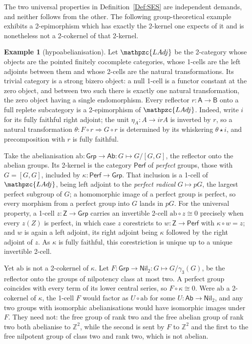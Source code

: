 \documentclass[reqno,a4paper]{amsart}
\numberwithin{equation}{section}
\theoremstyle{plain}
\theoremstyle{definition}
\newtheorem{example}[subsection]{Example}
\def\nameit#1{\textrm{#1}~}
\def\defx{\nameit{Definition}}
\def\dfn#1{{\itshape #1}}
\newcommand{\comp}{\circ}
\newcommand{\iso}{\cong}
\newcommand{\catfont}[1]{\ensuremath{\mathpzc{#1}}\xspace}
\newcommand{\onecat}[1]{\ensuremath{\mathsf{#1}}\xspace}
\newcommand{\LAdj}{\catfont{LAdj}}
\renewcommand{\1}{\onecat{1}}
\newcommand{\Grp}{\onecat{Grp}}
\newcommand{\Ab}{\onecat{Ab}}
\newcommand{\Perf}{\onecat{Perf}}
\newcommand{\Nil}{\onecat{Nil}}
\begin{document}
The two universal properties in \defx\ref{Def:SES} are independent demands, and neither follows from the other. The following group-theoretical example exhibits a 2-epimorphism which has exactly the 2-kernel one expects of it and is nonetheless not a 2-cokernel of that 2-kernel.

\begin{example}[hypoabelianisation]\label{Ex Hypoabelianisation}
	Let \(\LAdj\) be the 2-category whose objects are the pointed finitely cocomplete categories, whose 1-cells are the left adjoints between them and whose 2-cells are the natural transformations. Its trivial category is a strong bizero object: a null 1-cell is a functor constant at the zero object, and between two such there is exactly one natural transformation, the zero object having a single endomorphism. Every reflector \(r\colon\onecat{A}\to\onecat{B}\) onto a full replete subcategory is a 2-epimorphism of \(\LAdj\). Indeed, write \(i\) for its fully faithful right adjoint; the unit \(\eta_{A}\colon A\to irA\) is inverted by \(r\), so a natural transformation \(\theta\colon F\comp r\Rightarrow G\comp r\) is determined by its whiskering \(\theta\star i\), and precomposition with \(r\) is fully faithful.

	Take the abelianisation \(\mathrm{ab}\colon\Grp\to\Ab\colon G\mapsto G/[G,G]\), the reflector onto the abelian groups. Its 2-kernel is the category \(\Perf\) of \dfn{perfect} groups, those with \(G=[G,G]\), included by \(\kappa\colon\Perf\to\Grp\). That inclusion is a 1-cell of \(\LAdj\), being left adjoint to the \dfn{perfect radical} \(G\mapsto pG\), the largest perfect subgroup of \(G\); a homomorphic image of a perfect group is perfect, so every morphism from a perfect group into \(G\) lands in \(pG\). For the universal property, a 1-cell \(z\colon\onecat{Z}\to\Grp\) carries an invertible 2-cell \(\mathrm{ab}\comp z\iso 0\) precisely when every \(z(Z)\) is perfect, in which case \(z\) corestricts to \(w\colon\onecat{Z}\to\Perf\) with \(\kappa\comp w=z\); and \(w\) is again a left adjoint, its right adjoint being \(\kappa\) followed by the right adjoint of \(z\). As \(\kappa\) is fully faithful, this corestriction is unique up to a unique invertible 2-cell.

	Yet \(\mathrm{ab}\) is not a 2-cokernel of \(\kappa\). Let \(F\colon\Grp\to\Nil_{2}\colon G\mapsto G/\gamma_{3}(G)\), be the reflector onto the groups of nilpotency class at most two. A perfect group coincides with every term of its lower central series, so \(F\comp\kappa\iso 0\). Were \(\mathrm{ab}\) a 2-cokernel of \(\kappa\), the 1-cell \(F\) would factor as \(U\comp\mathrm{ab}\) for some \(U\colon\Ab\to\Nil_{2}\), and any two groups with isomorphic abelianisations would have isomorphic images under \(F\). They need not: the free group of rank two and the free abelian group of rank two both abelianise to \(\mathbb{Z}^{2}\), while the second is sent by \(F\) to \(\mathbb{Z}^{2}\) and the first to the free nilpotent group of class two and rank two, which is not abelian.


\end{example}
\end{document}
